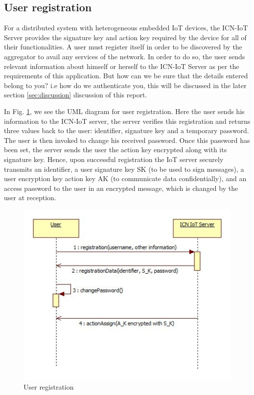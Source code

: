 \subsection{User registration}
\label{subsec:User registration}
For a distributed system with heterogeneous embedded IoT devices, the ICN-IoT Server provides the signature key and action key required by the device for all of their functionalities. A user must register itself in order to be discovered by the aggregator to avail any services of the network. 
In order to do so, the user sends relevant information about himself or herself to the ICN-IoT Server as per the requirements of this application. But how can we be sure that the details entered belong to you? i.e how do we authenticate you, this will be discussed in the later section \ref{sec:discussion}  discussion of this report. \par
In Fig. \ref{fig:User registration}, we see the UML diagram for user registration. Here the user sends his information to the ICN-IoT server, the server verifies this registration and returns three values back to the user: identifier, signature key and a temporary password. The user is then invoked to change his received password. Once this password has been set, the server sends the user the action key encrypted along with its signature key.
Hence, upon successful registration the IoT server securely transmits an identifier, a user signature key SK (to be used to sign messages), a user encryption key action key AK (to communicate data confidentially), and an access password to the user in an encrypted message, which is changed by the user at reception.
 \begin{figure}[ht]
	\centering
	\includegraphics[width=\linewidth]{Figures/User-registration-secure-subscribe.png}
	\caption[]{User registration}
	\label{fig:User registration}
\end{figure}
\par
